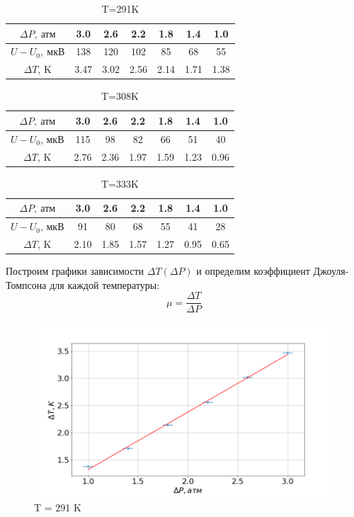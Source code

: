 \documentclass[a4paper, fontsize=14pt]{article}
\begin{document}
\begin{table}[H]

	\centering
	\begin{tabular}{|c|c|c|c|c|c|c|} \hline
		$\Delta P,\ \text{атм}$ & 3.0 & 2.6 & 2.2 & 1.8 & 1.4 & 1.0 \\ \hline
		$U-U_0,\ \text{мкВ}   $ & 138 & 120 & 102 & 85 & 68 & 55 \\ \hline
		$\Delta T$, K   & 3.47 & 3.02 & 2.56 & 2.14 & 1.71 & 1.38 \\ \hline
	\end{tabular}
		\caption{T=291K}
\end{table}
\begin{table}[H]

	\centering
	\begin{tabular}{|c|c|c|c|c|c|c|} \hline
		$\Delta P,\ \text{атм}$ & 3.0 & 2.6 & 2.2 & 1.8 & 1.4 & 1.0 \\ \hline
		$U-U_0$, мкВ    & 115 & 98 & 82 & 66 & 51 & 40 \\ \hline
		$\Delta T$, K   & 2.76 & 2.36 & 1.97 & 1.59 & 1.23 & 0.96 \\ \hline
	\end{tabular}
		\caption{T=308K}
\end{table}
\begin{table}[H]
	\centering
	\begin{tabular}{|c|c|c|c|c|c|c|} \hline
		$\Delta P,\ \text{атм}$ & 3.0 & 2.6 & 2.2 & 1.8 & 1.4 & 1.0 \\ \hline
		$U-U_0$, мкВ    & 91 & 80 & 68 & 55  & 41 & 28 \\ \hline
		$\Delta T$, K   & 2.10 & 1.85 & 1.57 & 1.27 & 0.95 & 0.65 \\ \hline
	\end{tabular}
		\caption{T=333K}
\end{table}



Построим графики зависимости $\Delta T(\Delta P)$ и определим коэффициент Джоуля-Томпсона для каждой температуры:
\[
	\mu = \frac{\Delta T}{\Delta P}
\]

	\begin{figure}[H]
	\includegraphics[width = 1.0\linewidth]{291.png}
		\caption{T = 291 K}
	\end{figure}
	
\end{document}
